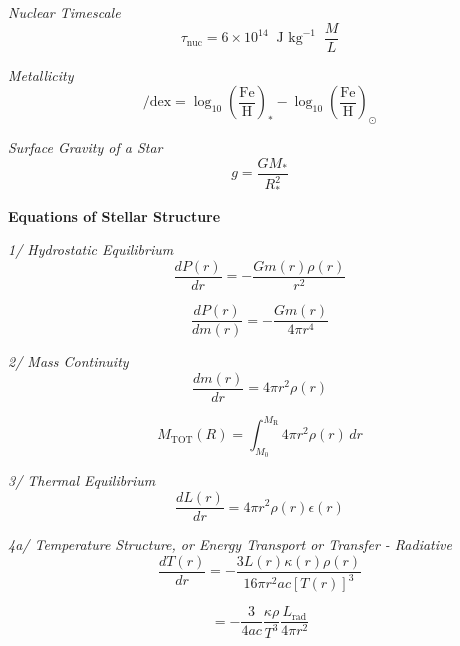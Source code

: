 \documentclass{spy}
\begin{document}
\textit {Nuclear Timescale}
\begin{equation}
\tau_\mathrm{nuc} = 6 \times 10^{14} \; \; \text{J kg}^{-1} \; \; \frac {M}{L}
\end{equation}


\textit{Metallicity}
\begin{equation}
[\mathrm{Fe/H}] / \mathrm{dex} = \log_{10} \left( \frac{\mathrm{Fe}}{\mathrm{H}} \right)_* - \log_{10} \left( \frac{\mathrm{Fe}}{\mathrm{H}} \right)_\odot
\end{equation}


\textit{Surface Gravity of a Star}
\begin{equation}
g = \frac{G M_\mathrm{*}}{R^2_\mathrm{*}}
\end{equation}

\textbf {Equations of Stellar Structure}

\textit {1/ Hydrostatic Equilibrium}
\begin{equation}
\frac {dP(r)}{dr} = - \frac {G m(r) \rho(r)}{r^2}
\end{equation}


\begin{equation}
\frac {dP(r)}{dm(r)} = - \frac {G m(r)}{4 \pi r^4}
\end{equation}

\textit {2/ Mass Continuity}
\begin{equation}
\frac {dm(r)}{dr} = 4 \pi r^2 \rho(r)
\end{equation}

\begin{equation}
M_\mathrm{TOT}(R) = \int_{M_\mathrm{0}}^{M_\mathrm{R}} 4 \pi r^2 \rho(r) \,dr
\end{equation}

\textit {3/ Thermal Equilibrium}
\begin{equation}
\frac {dL(r)}{dr} = 4 \pi r^2 \rho(r) \epsilon(r)
\end{equation}
\begin{center}
\end{center}

\textit {4a/ Temperature Structure, or Energy Transport or Transfer - Radiative}
\begin{equation}
\frac {dT(r)}{dr} = - \frac {3 L(r) \kappa(r) \rho(r)}{16 \pi r^2 a c \left[T(r)\right]^3}
\end{equation}

\begin{equation}
 = - \frac {3}{4ac} \frac {\kappa \rho}{T^3} \frac {L_\mathrm{rad}}{4 \pi r^2}
\end{equation}
\end{document}
